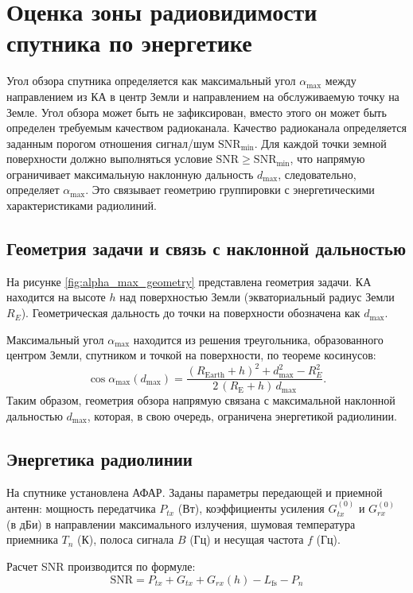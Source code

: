 \section{Оценка зоны радиовидимости спутника по энергетике}
\label{sec:snr}

Угол обзора спутника определяется как максимальный угол $\alpha_{\max}$
между направлением из КА в центр Земли и направлением на обслуживаемую точку на Земле.
Угол обзора может быть не зафиксирован, вместо этого он может быть 
определен требуемым качеством радиоканала. 
Качество радиоканала определяется заданным порогом отношения сигнал/шум
$\mathrm{SNR}_{\min}$. Для каждой точки
земной поверхности должно выполняться условие $\mathrm{SNR} \ge
\mathrm{SNR}_{\min}$, что напрямую ограничивает максимальную
наклонную дальность $d_{\max}$, следовательно, определяет $\alpha_{\max}$. 
Это связывает геометрию группировки с энергетическими характеристиками радиолиний.

\subsection{Геометрия задачи и связь с наклонной дальностью}

На рисунке \ref{fig:alpha_max_geometry} представлена геометрия
задачи. КА находится на высоте $h$ над
поверхностью Земли (экваториальный радиус Земли $R_E$). Геометрическая дальность
до точки на поверхности обозначена как $d_{\max}$.

Максимальный угол $\alpha_{\max}$ находится из решения треугольника,
образованного центром Земли, спутником и точкой на поверхности, по
теореме косинусов:
\[
  \cos\alpha_{\max}(d_{\max}) = \frac{(R_{\text{Earth}} + h)^2 +
  d_{\max}^2 - R_E^2}
  {2\,(R_{\text{E}} + h)\,d_{\max}}.
\]
Таким образом, геометрия обзора напрямую связана с максимальной
наклонной дальностью $d_{\max}$, которая, в свою очередь, ограничена
энергетикой радиолинии.

\subsection{Энергетика радиолинии}

На спутнике установлена АФАР. Заданы параметры передающей и
приемной антенн: мощность передатчика $P_{tx}$ (Вт), коэффициенты
усиления $G_{tx}^{(0)}$ и $G_{rx}^{(0)}$ (в дБи) в направлении
максимального излучения, шумовая температура приемника $T_n$ (К),
полоса сигнала $B$ (Гц) и несущая частота $f$ (Гц).

Расчет SNR производится по формуле:
\begin{equation}
\mathrm{SNR} = P_{tx} + G_{tx} + G_{rx}(h) - L_{\text{fs}} - P_{n}
\end{equation}

